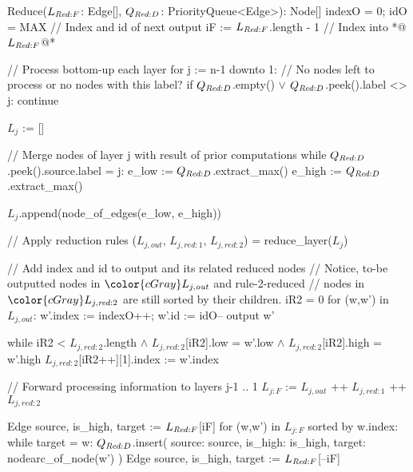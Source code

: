 \begin{blstlisting}
  Reduce($\ReduceLforward$: Edge[], $\ReduceQdep$: PriorityQueue<Edge>): Node[]
    indexO = 0; idO = MAX    // Index and id of next output
    iF := $\ReduceLforward$.length - 1         // Index into *@\color{cGray} $\ReduceLforward$@*

    // Process bottom-up each layer
    for j := n-1 downto 1:
      // No nodes left to process or no nodes with this label?
      if $\ReduceQdep$.empty() $\lor$ $\ReduceQdep$.peek().label <> j:
        continue

      $L_{j}$ := []

      // Merge nodes of layer j with result of prior computations
      while $\ReduceQdep$.peek().source.label = j:
        e_low  := $\ReduceQdep$.extract_max()
        e_high := $\ReduceQdep$.extract_max()

        $L_{j}$.append(node_of_edges(e_low, e_high))

      // Apply reduction rules
      ($L_{j,\mathit{out}}$, $L_{j,\mathit{red:}1}$, $L_{j,\mathit{red:}2}$) = reduce_layer($L_{j}$)

      // Add index and id to output and its related reduced nodes
      //   Notice, to-be outputted nodes in $\color{cGray}L_{j,\mathit{out}}$ and rule-2-reduced
      //   nodes in $\color{cGray}L_{j,\mathit{red:}2}$ are still sorted by their children.
      iR2 = 0
      for (w,w') in $L_{j,\mathit{out}}$:
        w'.index := indexO++; w'.id := idO--
        output w'

        while iR2 < $L_{j,\mathit{red:}2}$.length $\land$ $L_{j,\mathit{red:}2}$[iR2].low = w'.low
                                 $\land$ $L_{j,\mathit{red:}2}$[iR2].high = w'.high
          $L_{j,\mathit{red:}2}$[iR2++][1].index := w'.index

      // Forward processing information to layers j-1 .. 1
      $L_{j:F}$ := $L_{j,\mathit{out}}$ ++ $L_{j,\mathit{red:}1}$ ++ $L_{j,\mathit{red:}2}$

      Edge{ source, is_high, target } := $\ReduceLforward$[iF]
      for (w,w') in $L_{j:F}$ sorted by w.index:
        while target = w:
          $\ReduceQdep$.insert({
            source: source,
            is_high: is_high,
            target: nodearc_of_node(w') })
          Edge{ source, is_high, target } := $\ReduceLforward$[--iF]
\end{blstlisting}
